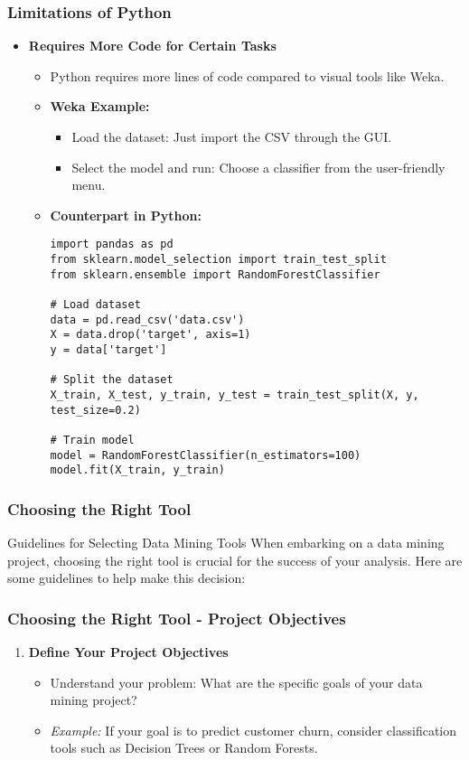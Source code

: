 \documentclass[aspectratio=169]{beamer}
\begin{document}
\begin{frame}[fragile]
    \frametitle{Limitations of Python}
    \begin{itemize}
        \item \textbf{Requires More Code for Certain Tasks}
        \begin{itemize}
            \item Python requires more lines of code compared to visual tools like Weka.
            \item \textbf{Weka Example:}
            \begin{itemize}
                \item Load the dataset: Just import the CSV through the GUI.
                \item Select the model and run: Choose a classifier from the user-friendly menu.
            \end{itemize}
            \item \textbf{Counterpart in Python:}
            \begin{lstlisting}
import pandas as pd
from sklearn.model_selection import train_test_split
from sklearn.ensemble import RandomForestClassifier

# Load dataset
data = pd.read_csv('data.csv')
X = data.drop('target', axis=1)
y = data['target']

# Split the dataset
X_train, X_test, y_train, y_test = train_test_split(X, y, test_size=0.2)

# Train model
model = RandomForestClassifier(n_estimators=100)
model.fit(X_train, y_train)
            \end{lstlisting}
        \end{itemize}
    \end{itemize}
\end{frame}

\begin{frame}[fragile]
    \frametitle{Choosing the Right Tool}
    \begin{block}{Guidelines for Selecting Data Mining Tools}
        When embarking on a data mining project, choosing the right tool is crucial for the success of your analysis. Here are some guidelines to help make this decision:
    \end{block}
\end{frame}

\begin{frame}[fragile]
    \frametitle{Choosing the Right Tool - Project Objectives}
    \begin{enumerate}
        \item \textbf{Define Your Project Objectives}
        \begin{itemize}
            \item Understand your problem: What are the specific goals of your data mining project?
            \item \textit{Example:} If your goal is to predict customer churn, consider classification tools such as Decision Trees or Random Forests.
        \end{itemize}
    \end{enumerate}
\end{frame}
\end{document}
